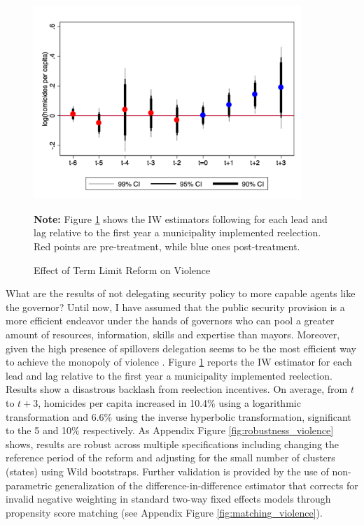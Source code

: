\documentclass[12pt]{amsart}
\numberwithin{equation}{section}
\theoremstyle{definition}
\theoremstyle{definition}
\theoremstyle{definition}
\begin{document}
\begin{figure}[h] 
\centering
 \caption{Effect of Term Limit Reform on Violence}
 \label{fig:as_violence}
\includegraphics[width=0.9\textwidth]{../Figures/catts_homicides.png}
       \captionsetup{justification=centering}
       
 \textbf{Note:} Figure \ref{fig:as_violence} shows the IW estimators following \citet{abraham_sun_2020} for each lead and lag relative to the first year a municipality implemented reelection. Red points are pre-treatment, while blue ones post-treatment. 
    
\end{figure}    
     

What are the results of not delegating security policy to more capable agents like the governor? Until now, I have assumed that the public security provision is a more efficient endeavor under the hands of governors who can pool a greater amount of resources, information, skills and expertise than mayors. Moreover, given the high presence of spillovers delegation seems to be the most efficient way to achieve the monopoly of violence \citep{oates_1972}. Figure \ref{fig:as_violence} reports the IW estimator for each lead and lag relative to the first year a municipality implemented reelection. Results show a disastrous backlash from reelection incentives. On average, from $t$ to $t+3$, homicides per capita increased in 10.4\% using a logarithmic transformation and 6.6\% using the inverse hyperbolic transformation, significant to the 5 and 10\% respectively. As Appendix Figure \ref{fig:robustness_violence} shows, results are robust across multiple specifications including changing the reference period of the reform and adjusting for the small number of clusters (states) using Wild bootstraps. Further validation is provided by the use of \citet{imai_etal_2020} non-parametric generalization of the difference-in-difference estimator that corrects for invalid negative weighting in standard two-way fixed effects models through propensity score matching (see Appendix Figure \ref{fig:matching_violence}). 
\end{document}
